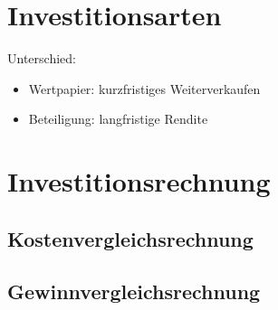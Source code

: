 \section{Investitionsarten}
Unterschied:
\begin{itemize}
\item Wertpapier: kurzfristiges Weiterverkaufen
\item Beteiligung: langfristige Rendite
\end{itemize}

\section{Investitionsrechnung}
\subsection{Kostenvergleichsrechnung}
\subsection{Gewinnvergleichsrechnung}


